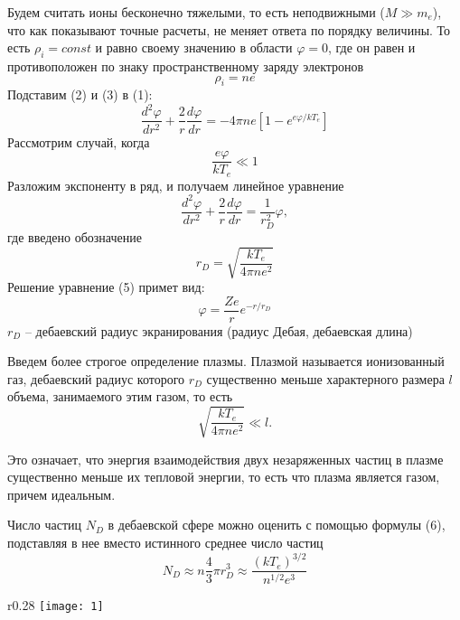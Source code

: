 Будем считать ионы бесконечно тяжелыми,
то есть неподвижными ($M \gg m_e$), что
как показывают точные расчеты, не меняет
ответа по порядку величины. То есть
$\rho_i = const$ и равно своему значению
в области $\varphi = 0$, где он равен и
противоположен по знаку
пространственному заряду электронов
\begin{equation}
    \rho_i = ne
\end{equation}
Подставим (2) и (3) в (1):
\begin{equation}
    \frac{d^2\varphi}{dr^2}+\frac{2}{r}\frac{d\varphi}{dr}
    = -4\pi n e \left[ 1- e^{e\varphi/k
    T_e} \right] 
\end{equation}
Рассмотрим случай, когда 
\[
\frac{e\varphi}{kT_e} \ll 1
\]
Разложим экспоненту в ряд, и получаем
линейное уравнение 
\begin{equation}
    \frac{d^2\varphi}{dr^2}+\frac{2}{r}\frac{d\varphi}{dr}
    = \frac{1}{r_D^2} \varphi,  
\end{equation}
где введено обозначение
\begin{equation}
    r_D = \sqrt{\frac{kT_e}{4\pi n e^2}}
\end{equation}
Решение уравнение (5) примет вид:
\begin{equation}
    \varphi = \frac{Ze}{r}e^{-r/r_D}
\end{equation}
$r_D$ -- дебаевский радиус экранирования
(радиус Дебая, дебаевская длина)

Введем более строгое определение плазмы.
Плазмой называется ионизованный газ,
дебаевский радиус которого $r_D$
существенно меньше характерного размера
$l$ объема, занимаемого этим газом, то
есть
\[
    \sqrt{\frac{k T_e}{4\pi n e^2}} \ll
    l.
\]

Это означает, что энергия взаимодействия
двух незаряженных частиц в плазме
существенно меньше их тепловой энергии,
то есть что плазма является газом,
причем идеальным.

Число частиц $N_D$ в дебаевской сфере
можно оценить с помощью формулы (6),
подставляя в нее вместо истинного
среднее число частиц 
\begin{equation}
    N_D \approx n\frac{4}{3}\pi r_D^3
    \approx
    \frac{(kT_e)^{3/2}}{n^{1/2}e^3}
\end{equation}
    
\begin{wrapfigure}{r}{0.28\linewidth}
    \vspace{-3ex}
    \texttt{[image: 1]}
    \captionsetup{justification=centering}
    \caption{}
\end{wrapfigure}

